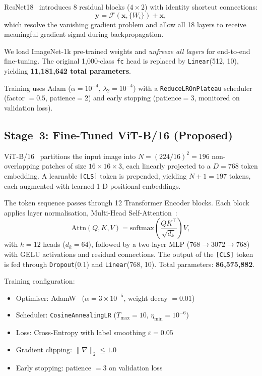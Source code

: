 \documentclass[journal]{IEEEtran}
\begin{document}
ResNet18~\cite{he2016deep} introduces 8 residual blocks
($4 \times 2$) with identity shortcut connections:
\begin{equation}
  \mathbf{y} = \mathcal{F}(\mathbf{x}, \{W_i\}) + \mathbf{x},
  \label{eq:residual}
\end{equation}
which resolve the vanishing gradient problem and allow all
18 layers to receive meaningful gradient signal during
backpropagation.

We load ImageNet-1k pre-trained weights and \emph{unfreeze all
layers} for end-to-end fine-tuning.
The original 1,000-class \texttt{fc} head is replaced by
\texttt{Linear}(512, 10), yielding
\textbf{11,181,642 total parameters}.

Training uses Adam
($\alpha = 10^{-4}$, $\lambda_2 = 10^{-4}$) with a
\texttt{ReduceLROnPlateau} scheduler (factor $=0.5$,
patience$=2$) and early stopping (patience$=3$, monitored on
validation loss).

\subsection{Stage~3: Fine-Tuned ViT-B/16 (Proposed)}

ViT-B/16~\cite{dosovitskiy2020image} partitions the input
image into $N = (224/16)^2 = 196$ non-overlapping patches of
size $16 \times 16 \times 3$, each linearly projected to a
$D=768$ token embedding.
A learnable \texttt{[CLS]} token is prepended, yielding $N+1=197$
tokens, each augmented with learned 1-D positional embeddings.

The token sequence passes through 12 Transformer Encoder blocks.
Each block applies layer normalisation,
Multi-Head Self-Attention~\cite{vaswani2017attention}:
\begin{equation}
  \text{Attn}(Q,K,V)
  = \text{softmax}\!\left(\frac{QK^\top}{\sqrt{d_k}}\right)V,
  \label{eq:attn}
\end{equation}
with $h=12$ heads ($d_k = 64$), followed by a two-layer MLP
($768 \to 3072 \to 768$) with GELU activations and residual
connections.
The output of the \texttt{[CLS]} token is fed through
\texttt{Dropout}(0.1) and \texttt{Linear}(768, 10).
Total parameters: \textbf{86,575,882}.

Training configuration:
\begin{itemize}
  \item Optimiser: AdamW~\cite{loshchilov2019decoupled}
        ($\alpha = 3 \times 10^{-5}$, weight decay $= 0.01$)
  \item Scheduler: \texttt{CosineAnnealingLR}
        ($T_{\max}=10$, $\eta_{\min}=10^{-6}$)
  \item Loss: Cross-Entropy with label smoothing
        $\varepsilon = 0.05$~\cite{muller2019does}
  \item Gradient clipping: $\|\nabla\|_2 \le 1.0$
  \item Early stopping: patience $= 3$ on validation loss
\end{itemize}
\end{document}
